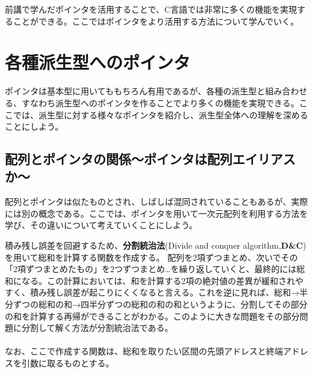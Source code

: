 前講で学んだポインタを活用することで、C言語では非常に多くの機能を実現することができる。ここではポインタをより活用する方法について学んでいく。
\section{各種派生型へのポインタ}
ポインタは基本型に用いてももちろん有用であるが、各種の派生型と組み合わせる、すなわち派生型へのポインタを作ることでより多くの機能を実現できる。ここでは、派生型に対する様々なポインタを紹介し、派生型全体への理解を深めることにしよう。
\subsection{配列とポインタの関係〜ポインタは配列エイリアスか〜}
配列とポインタは似たものとされ、しばしば混同されていることもあるが、実際には別の概念である。ここでは、ポインタを用いて一次元配列を利用する方法を学び、その違いについて考えていくことにしよう。
\begin{boxnote}
積み残し誤差を回避するため、\textbf{分割統治法}(Divide and conquer algorithm,\textbf{D\&C})を用いて総和を計算する関数を作成する。
配列を2項ずつまとめ、次いでその「2項ずつまとめたもの」を2つずつまとめ…を繰り返していくと、最終的には総和になる。この計算においては、和を計算する2項の絶対値の差異が緩和されやすく、積み残し誤差が起こりにくくなると言える。これを逆に見れば、総和→半分ずつの総和の和→四半分ずつの総和の和の和というように、分割してその部分の和を計算する再帰ができることがわかる。このように大きな問題をその部分問題に分割して解く方法が分割統治法である。
\\ \\
なお、ここで作成する関数は、総和を取りたい区間の先頭アドレスと終端アドレスを引数に取るものとする。
\end{boxnote}

